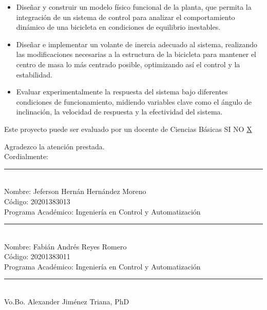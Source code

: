\documentclass[10pt,letterpaper]{article} %
\begin{document}
\begin{itemize}
    \item Diseñar y construir un modelo físico funcional de la planta, que permita la integración de un sistema de control para analizar el comportamiento dinámico de una bicicleta en condiciones de equilibrio inestables.
    \item Diseñar e implementar un volante de inercia adecuado al sistema, realizando las modificaciones necesarias a la estructura de la bicicleta para mantener el centro de masa lo más centrado posible, optimizando así el control y la estabilidad.
    \item Evaluar experimentalmente la respuesta del sistema bajo diferentes condiciones de funcionamiento, midiendo variables clave como el ángulo de inclinación, la velocidad de respuesta y la efectividad del sistema.
\end{itemize}

\vspace{0.2cm}

Este proyecto puede ser evaluado por un docente de Ciencias Básicas \hspace{0.5cm} SI \underline{\hspace{1cm}} \hspace{0.5cm} NO \underline{\hspace{0.3cm}X\hspace{0.3cm}}

\vspace{0.2cm}

Agradezco la atención prestada.\\
Cordialmente:

\vspace{0.5cm}

\begin{minipage}[t]{0.48\textwidth}
    \rule{6.5cm}{0.4pt}\\
    Nombre: Jeferson Hernán Hernández Moreno\\
    Código: 20201383013\\
    Programa Académico: Ingeniería en Control y Automatización
\end{minipage}
\hfill
\begin{minipage}[t]{0.48\textwidth}
    \rule{6.5cm}{0.4pt}\\
    Nombre: Fabián Andrés Reyes Romero\\
    Código: 20201383011\\
    Programa Académico: Ingeniería en Control y Automatización
\end{minipage}

\vspace{1.5cm}

\begin{center}
    \rule{6.5cm}{0.4pt}\\
    Vo.Bo. Alexander Jiménez Triana, PhD
\end{center}
\end{document}
